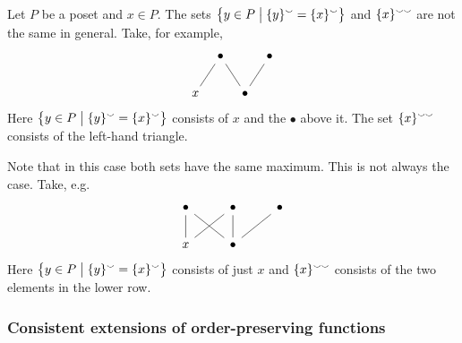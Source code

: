 \begin{example}
Let $P$ be a poset and $x\in P$. The sets $\setbuilder[\big]{y\in P}{ \{y\}^\cons = \{x\}^\cons }$ and $\{x\}^{\smallsmile\smallsmile}$ are not the same in general. Take, for example,
\[ \begin{tikzcd}[column sep=tiny]
{} & \bullet \ar[dl ,dash] \ar[dr, dash] & {} & \bullet \ar[dl, dash] \\
x & {} & \bullet & {}
\end{tikzcd} \]
Here $\setbuilder[\big]{y\in P}{\{y\}^\cons = \{x\}^\cons}$ consists of $x$ and the $\bullet$ above it. The set $\{x\}^{\smallsmile\smallsmile}$ consists of the left-hand triangle.

Note that in this case both sets have the same maximum. This is not always the case. Take, e.g.\ 
\[ \begin{tikzcd}
\bullet \ar[d, dash] \ar[dr, dash] & \bullet \ar[d, dash] \ar[dl, dash] & \bullet \ar[dl, dash] \\
x & \bullet & {}
\end{tikzcd} \]
Here $\setbuilder[\big]{y\in P}{ \{y\}^\cons = \{x\}^\cons }$ consists of just $x$ and $\{x\}^{\smallsmile\smallsmile}$ consists of the two elements in the lower row.
\end{example}

\subsubsection{Consistent extensions of order-preserving functions}

